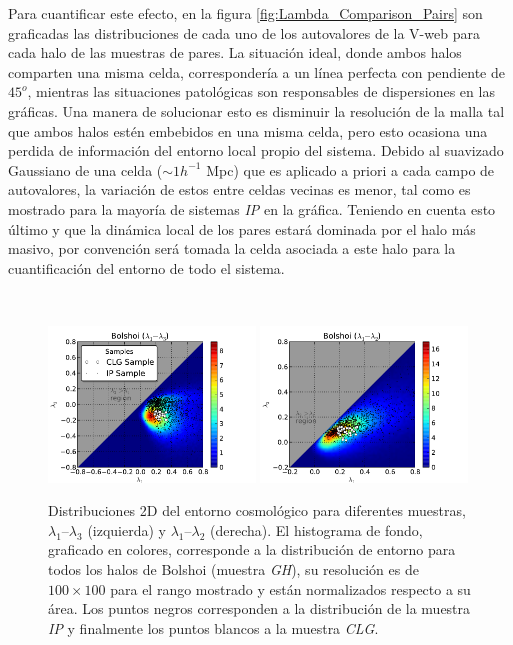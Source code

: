 Para cuantificar este efecto, en la figura \ref{fig:Lambda_Comparison_Pairs}
son graficadas las distribuciones de cada uno de los autovalores de la V-web
para cada halo de las muestras de pares. La situación ideal, donde ambos
halos comparten una misma celda, correspondería a un línea perfecta 
con pendiente de $45^o$, mientras las situaciones patológicas son responsables 
de dispersiones en las gráficas. Una manera de solucionar esto es disminuir la
resolución de la malla tal que ambos halos estén embebidos en una misma celda, 
pero esto ocasiona una perdida de información del entorno local propio del 
sistema. Debido al suavizado Gaussiano de una celda ($\sim 1 h^{-1}$ Mpc) 
que es aplicado a priori a cada campo de autovalores, la variación de estos 
entre celdas vecinas es menor, tal como es mostrado para la mayoría de 
sistemas \textit{IP} en la gráfica. Teniendo en cuenta esto último y que la 
dinámica local de los pares estará dominada por el halo más masivo, por 
convención será tomada la celda asociada a este halo para la cuantificación
del entorno de todo el sistema.

\
\begin{figure}[htbp]
	\centering
	\includegraphics[trim = 0mm 0mm 15mm 0mm, clip, width=0.49\textwidth]
	{./figures/4_results/CLG_Environmet_L1L3.pdf}
	\includegraphics[trim = 0mm 0mm 15mm 0mm, clip, width=0.49\textwidth]
	{./figures/4_results/CLG_Environmet_L1L2.pdf}
	
	\caption{\small{Distribuciones 2D del entorno cosmológico para 
	diferentes muestras, $\lambda_1$--$\lambda_3$ (izquierda) y 
	$\lambda_1$--$\lambda_2$ (derecha). El histograma de fondo, graficado
	en colores, corresponde a la distribución de entorno para todos los 
	halos de Bolshoi (muestra \textit{GH}), su resolución es de $100\times 100$ 
	para el rango mostrado y están normalizados respecto a su área. Los 
	puntos negros corresponden a la distribución de la muestra \textit{IP} 
	y finalmente los puntos blancos a la muestra \textit{CLG}.}}
	\label{fig:2D_Samples_Eigenvalues}
\end{figure}


